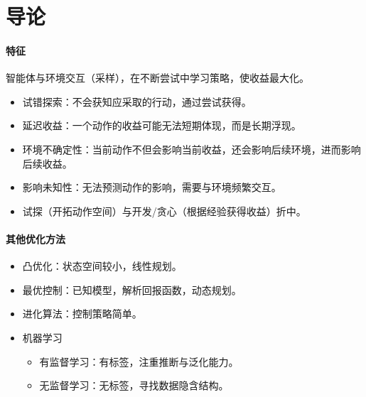 \documentclass[
12pt, %
a4paper, 
oneside, %
headinclude,footinclude, %
]{scrartcl}
\title{\normalfont\spacedallcaps{强化学习}}
\date{}
\begin{document}
\maketitle
\newpage
\hypertarget{toc}{}
\begingroup
\begin{multicols}{2}
\tableofcontents
\end{multicols}
\endgroup
\newpage
\listoffigures
\listoftables
\listofalgorithms
\listoftips
\newpage
\section{导论}
\paragraph{特征}
智能体与环境交互（采样），在不断尝试中学习策略，使收益最大化。
\begin{itemize}
\item 试错探索：不会获知应采取的行动，通过尝试获得。
\item 延迟收益：一个动作的收益可能无法短期体现，而是长期浮现。
\item 环境不确定性：当前动作不但会影响当前收益，还会影响后续环境，进而影响后续收益。
\item 影响未知性：无法预测动作的影响，需要与环境频繁交互。
\item 试探（开拓动作空间）与开发/贪心（根据经验获得收益）折中。
\end{itemize}
\paragraph{其他优化方法}
\begin{itemize}
\item 凸优化：状态空间较小，线性规划。
\item 最优控制：已知模型，解析回报函数，动态规划。
\item 进化算法：控制策略简单。
\item 机器学习
\begin{itemize}
\item 有监督学习：有标签，注重推断与泛化能力。
\item 无监督学习：无标签，寻找数据隐含结构。
\end{itemize}
\end{itemize}
\end{document}
